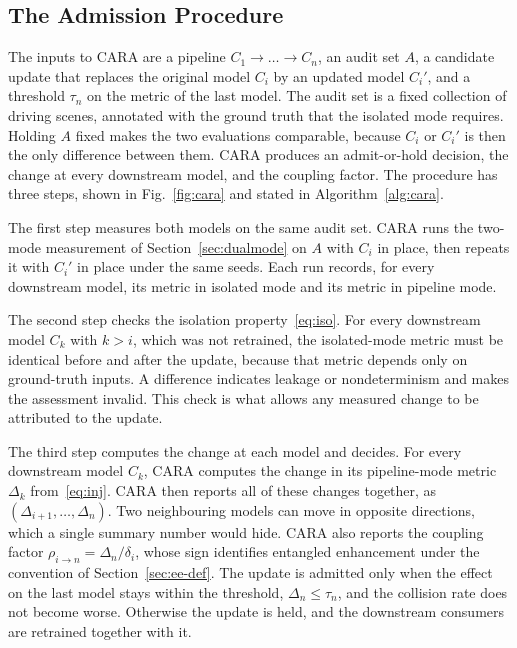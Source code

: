 \documentclass[conference]{IEEEtran}
\begin{document}
\subsection{The Admission Procedure}
The inputs to CARA are a pipeline $C_1 \to \dots \to C_n$, an audit set $A$, a
candidate update that replaces the original model $C_i$ by an updated model
$C_i'$, and a threshold $\tau_n$ on the metric of the last model. The audit set is a fixed collection of
driving scenes, annotated with the ground truth that the isolated mode requires.
Holding $A$ fixed makes the two evaluations comparable, because $C_i$ or $C_i'$ is
then the only difference between them. CARA produces an admit-or-hold decision, the
change at every downstream model, and the coupling factor. The procedure has three
steps, shown in Fig.~\ref{fig:cara} and stated in Algorithm~\ref{alg:cara}.

The first step measures both models on the same audit set. CARA runs the two-mode
measurement of Section~\ref{sec:dualmode} on $A$ with $C_i$ in place, then repeats
it with $C_i'$ in place under the same seeds. Each run records, for every
downstream model, its metric in isolated mode and its metric in pipeline mode.

The second step checks the isolation property~\eqref{eq:iso}. For every
downstream model $C_k$ with $k>i$, which was not retrained, the isolated-mode
metric must be identical before and
after the update, because that metric depends only on ground-truth inputs. A
difference indicates leakage or nondeterminism and makes the assessment invalid.
This check is what allows any measured change to be attributed to the update.

The third step computes the change at each model and decides. For every downstream
model $C_k$, CARA computes the change in its pipeline-mode metric $\Delta_k$
from~\eqref{eq:inj}. CARA then reports all of these changes together, as
$(\Delta_{i+1}, \dots, \Delta_n)$. Two neighbouring models can move in opposite
directions, which a single summary number would hide. CARA also reports the coupling factor
$\rho_{i\to n} = \Delta_n / \delta_i$, whose sign identifies entangled enhancement
under the convention of Section~\ref{sec:ee-def}. The update is admitted only when the effect on the last
model stays within the threshold, $\Delta_n \le \tau_n$, and the collision rate does
not become worse. Otherwise the update is held, and the
downstream consumers are retrained together with it.
\end{document}
